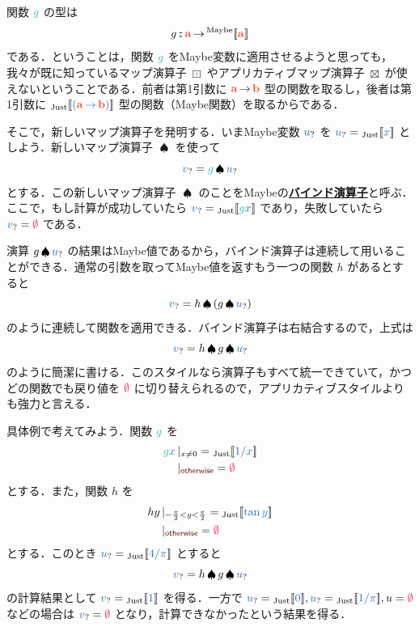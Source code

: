 \documentclass[a5paper,twoside,fleqn,draft]{jsbook}
\def\[{[\![}
\def\]{]\!]}
\def\constantColor{WildStrawberry}
\def\keywordColor{Sepia}
\def\varColor{NavyBlue}
\def\funcColor{BlueGreen}
\def\typeColor{RedOrange}
\newcommand{\keyword}[1]{{\underline{\textbf{#1}}}}
\newcommand{\mKeyword}[1]{\textcolor{\keywordColor}{\mathsf{#1}}}
\newcommand{\mOtherwiseKeyword}{\mKeyword{otherwise}}
\DeclareMathOperator{\mOtherwise}{\mOtherwiseKeyword}
\newcommand{\mNothing}{\textcolor{\constantColor}{\emptyset}}
\newcommand{\mVar}[1]{\textcolor{\varColor}{#1}}
\newcommand{\mXVar}{\mVar{x}}
\newcommand{\mFunc}[1]{\textcolor{\funcColor}{#1}}
\newcommand{\mGFunc}{\mFunc{g}}
\DeclareMathOperator{\mAppMapMaybe}{\boxtimes}
\DeclareMathOperator{\mBindMaybe}{\spadesuit}
\DeclareMathOperator{\mFuncArrow}{\rightarrow}
\DeclareMathOperator{\mIn}{{:\!:}}
\DeclareMathOperator{\mMapMaybe}{\boxdot}
\newcommand{\mType}[1]{\textcolor{\typeColor}{\mathbf{#1}}}
\newcommand{\mA}{\mType{a}}
\newcommand{\mB}{\mType{b}}
\newcommand{\mTypeAssemble}[2]{{}^\mathrm{#1}\[\mType{#2}\]}
\newcommand{\mMaybeType}[1]{\mTypeAssemble{Maybe}{#1}}
\newcommand{\mValueConstructor}[1]{\mathrm{#1}}
\newcommand{\mValueWith}[2]{{}_\mValueConstructor{#1}\[\mVar{#2}\]}
\newcommand{\mJustWith}[1]{\mValueWith{Just}{#1}}
\newcommand{\mMaybe}[1]{\mVar{#1}_?}
\newcommand{\mGuard}[1]{\mathop{\mid_{#1}}}
\newcommand{\mProjEXP}[2]{#1\mFuncArrow#2} %
\begin{document}
関数 $\mGFunc$ の型は
\begin{equation}
  g\mIn\mProjEXP{\mA }{\mMaybeType{a}}
\end{equation}
である．ということは，関数 $\mGFunc$ をMaybe変数に適用させるようと思っても，我々が既に知っているマップ演算子 $\mMapMaybe$ やアプリカティブマップ演算子 $\mAppMapMaybe$ が使えないということである．前者は第1引数に $\mProjEXP{\mA }{\mB }$ 型の関数を取るし，後者は第1引数に $\mJustWith{(\mProjEXP{\mA }{\mB })}$ 型の関数（Maybe関数）を取るからである．


そこで，新しいマップ演算子を発明する．いまMaybe変数 $\mMaybe{u}$ を $\mMaybe{u}=\mJustWith{x}$ としよう．新しいマップ演算子 $\mBindMaybe$ を使って
\begin{equation}
  \mMaybe{v}=\mGFunc\mBindMaybe\mMaybe{u}
\end{equation}
とする．この新しいマップ演算子 $\mBindMaybe$ のことをMaybeの\keyword{バインド演算子}と呼ぶ．ここで，もし計算が成功していたら $\mMaybe{v}=\mJustWith{\mGFunc\mXVar}$ であり，失敗していたら $\mMaybe{v}=\mNothing$ である．

演算 $g\mBindMaybe\mMaybe{u}$ の結果はMaybe値であるから，バインド演算子は連続して用いることができる．通常の引数を取ってMaybe値を返すもう一つの関数 $h$ があるとすると
\begin{equation}
  \mMaybe{v}=h\mBindMaybe{}(g\mBindMaybe\mMaybe{u})
\end{equation}
のように連続して関数を適用できる．バインド演算子は右結合するので，上式は
\begin{equation}
  \label{eq:maybe-z-bind-style}
  \mMaybe{v}=h\mBindMaybe g\mBindMaybe\mMaybe{u}
\end{equation}
のように簡潔に書ける．このスタイルなら演算子もすべて統一できていて，かつどの関数でも戻り値を $\mNothing$ に切り替えられるので，アプリカティブスタイルよりも強力と言える．

具体例で考えてみよう．関数 $\mGFunc$ を
\begin{equation}
  \begin{aligned}
    \mGFunc\mXVar&\mGuard{x\neq0}=\mJustWith{1/x}\\
    &\mGuard{\mOtherwise}=\mNothing
  \end{aligned}
\end{equation}
とする．また，関数 $h$ を
\begin{equation}
  \begin{aligned}
    hy&\mGuard{-\frac{\pi}{2}<y<\frac{\pi}{2}}=\mJustWith{\tan y}\\
    &\mGuard{\mOtherwise}=\mNothing
  \end{aligned}
\end{equation}
とする．このとき $\mMaybe{u}=\mJustWith{4/\pi}$ とすると
\begin{equation}
\mMaybe{v}=h\mBindMaybe g\mBindMaybe\mMaybe{u}
\end{equation}
の計算結果として $\mMaybe{v}=\mJustWith{1}$ を得る．一方で $\mMaybe{u}=\mJustWith{0},\mMaybe{u}=\mJustWith{1/\pi},u=\mNothing$ などの場合は $\mMaybe{v}=\mNothing$ となり，計算できなかったという結果を得る．
\end{document}
